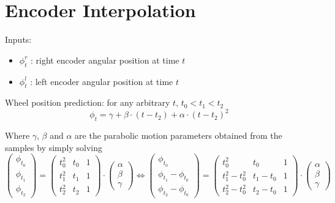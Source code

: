 \documentclass[a4paper]{article}
\begin{document}
\section{Encoder Interpolation}

Inputs:
\begin{itemize}
\item $\phi_t^r$ : right encoder angular position at time $t$
\item $\phi_t^l$ : left encoder angular position at time $t$
\end{itemize}

Wheel position prediction: for any arbitrary $t$, $t_0 < t_1 < t_2$
\begin{equation}
	\phi_t = \gamma + \beta \cdot (t - t_2) + \alpha \cdot (t - t_2)^2
\end{equation}

Where $\gamma$, $\beta$ and $\alpha$ are the parabolic motion parameters obtained from the samples by simply solving
\begin{equation}
    \begin{pmatrix}
        \phi_{t_0} \\
        \phi_{t_1} \\
        \phi_{t_2}
    \end{pmatrix}
    =
    \begin{pmatrix}
        t_0^2 & t_0 & 1 \\
        t_1^2 & t_1 & 1 \\
        t_2^2 & t_2 & 1
    \end{pmatrix}
    \cdot
    \begin{pmatrix}
        \alpha \\
        \beta \\
        \gamma
    \end{pmatrix}
    \iff
    \begin{pmatrix}
        \phi_{t_0} \\
        \phi_{t_1} - \phi_{t_0} \\
        \phi_{t_2} - \phi_{t_0}
    \end{pmatrix}
    =
    \begin{pmatrix}
        t_0^2 & t_0 & 1 \\
        t_1^2 - t_0^2 & t_1 - t_0 & 1 \\
        t_2^2 - t_0^2 & t_2 - t_0 & 1
    \end{pmatrix}
    \cdot
    \begin{pmatrix}
        \alpha \\
        \beta \\
        \gamma
    \end{pmatrix}
\end{equation}
\end{document}
